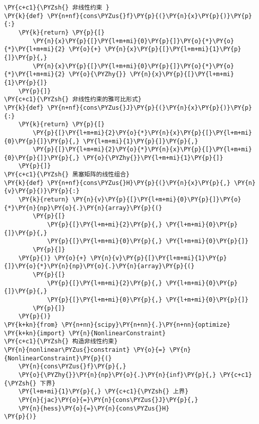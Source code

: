     \begin{tcolorbox}[breakable, size=fbox, boxrule=1pt, pad at break*=1mm,colback=cellbackground, colframe=cellborder]
\begin{Verbatim}[commandchars=\\\{\}]
\PY{c+c1}{\PYZsh{} 非线性约束 }
\PY{k}{def} \PY{n+nf}{cons\PYZus{}f}\PY{p}{(}\PY{n}{x}\PY{p}{)}\PY{p}{:}
    \PY{k}{return} \PY{p}{[}
        \PY{n}{x}\PY{p}{[}\PY{l+m+mi}{0}\PY{p}{]}\PY{o}{*}\PY{o}{*}\PY{l+m+mi}{2} \PY{o}{+} \PY{n}{x}\PY{p}{[}\PY{l+m+mi}{1}\PY{p}{]}\PY{p}{,} 
        \PY{n}{x}\PY{p}{[}\PY{l+m+mi}{0}\PY{p}{]}\PY{o}{*}\PY{o}{*}\PY{l+m+mi}{2} \PY{o}{\PYZhy{}} \PY{n}{x}\PY{p}{[}\PY{l+m+mi}{1}\PY{p}{]}
    \PY{p}{]}
\PY{c+c1}{\PYZsh{} 非线性约束的雅可比形式}
\PY{k}{def} \PY{n+nf}{cons\PYZus{}J}\PY{p}{(}\PY{n}{x}\PY{p}{)}\PY{p}{:}
    \PY{k}{return} \PY{p}{[}
        \PY{p}{[}\PY{l+m+mi}{2}\PY{o}{*}\PY{n}{x}\PY{p}{[}\PY{l+m+mi}{0}\PY{p}{]}\PY{p}{,} \PY{l+m+mi}{1}\PY{p}{]}\PY{p}{,} 
        \PY{p}{[}\PY{l+m+mi}{2}\PY{o}{*}\PY{n}{x}\PY{p}{[}\PY{l+m+mi}{0}\PY{p}{]}\PY{p}{,} \PY{o}{\PYZhy{}}\PY{l+m+mi}{1}\PY{p}{]}
    \PY{p}{]}
\PY{c+c1}{\PYZsh{} 黑塞矩阵的线性组合}
\PY{k}{def} \PY{n+nf}{cons\PYZus{}H}\PY{p}{(}\PY{n}{x}\PY{p}{,} \PY{n}{v}\PY{p}{)}\PY{p}{:}
    \PY{k}{return} \PY{n}{v}\PY{p}{[}\PY{l+m+mi}{0}\PY{p}{]}\PY{o}{*}\PY{n}{np}\PY{o}{.}\PY{n}{array}\PY{p}{(}
        \PY{p}{[}
            \PY{p}{[}\PY{l+m+mi}{2}\PY{p}{,} \PY{l+m+mi}{0}\PY{p}{]}\PY{p}{,} 
            \PY{p}{[}\PY{l+m+mi}{0}\PY{p}{,} \PY{l+m+mi}{0}\PY{p}{]}
        \PY{p}{]}
    \PY{p}{)} \PY{o}{+} \PY{n}{v}\PY{p}{[}\PY{l+m+mi}{1}\PY{p}{]}\PY{o}{*}\PY{n}{np}\PY{o}{.}\PY{n}{array}\PY{p}{(}
        \PY{p}{[}
            \PY{p}{[}\PY{l+m+mi}{2}\PY{p}{,} \PY{l+m+mi}{0}\PY{p}{]}\PY{p}{,} 
            \PY{p}{[}\PY{l+m+mi}{0}\PY{p}{,} \PY{l+m+mi}{0}\PY{p}{]}
        \PY{p}{]}
    \PY{p}{)}
\PY{k+kn}{from} \PY{n+nn}{scipy}\PY{n+nn}{.}\PY{n+nn}{optimize} \PY{k+kn}{import} \PY{n}{NonlinearConstraint}
\PY{c+c1}{\PYZsh{} 构造非线性约束}
\PY{n}{nonlinear\PYZus{}constraint} \PY{o}{=} \PY{n}{NonlinearConstraint}\PY{p}{(}
    \PY{n}{cons\PYZus{}f}\PY{p}{,} 
    \PY{o}{\PYZhy{}}\PY{n}{np}\PY{o}{.}\PY{n}{inf}\PY{p}{,} \PY{c+c1}{\PYZsh{} 下界}
    \PY{l+m+mi}{1}\PY{p}{,} \PY{c+c1}{\PYZsh{} 上界}
    \PY{n}{jac}\PY{o}{=}\PY{n}{cons\PYZus{}J}\PY{p}{,} 
    \PY{n}{hess}\PY{o}{=}\PY{n}{cons\PYZus{}H}
\PY{p}{)}
\end{Verbatim}
\end{tcolorbox}

